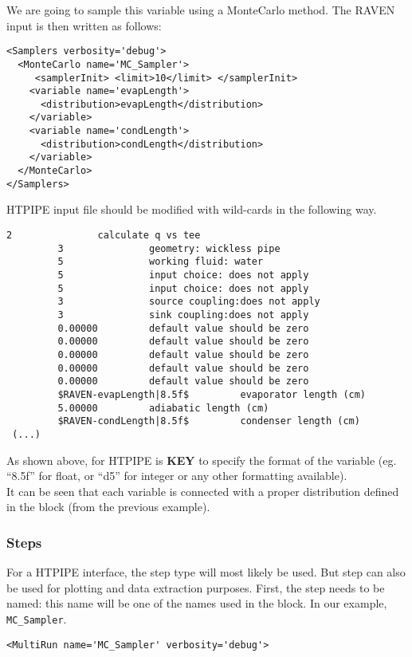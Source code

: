 \noindent We are going to sample this variable using a MonteCarlo method.
The RAVEN input is then written as follows:

\begin{lstlisting}[style=XML,morekeywords={name,type,construction,lowerBound,steps,limit,initialSeed}]
<Samplers verbosity='debug'>
  <MonteCarlo name='MC_Sampler'>
     <samplerInit> <limit>10</limit> </samplerInit>
    <variable name='evapLength'>
      <distribution>evapLength</distribution>
    </variable>
    <variable name='condLength'>
      <distribution>condLength</distribution>
    </variable>
  </MonteCarlo>
</Samplers>
\end{lstlisting}

HTPIPE input file should be modified with wild-cards in the following way.
\begin{lstlisting}[basicstyle=\tiny]
         2               calculate q vs tee
         3               geometry: wickless pipe    
         5               working fluid: water     
         5               input choice: does not apply      
         5               input choice: does not apply      
         3               source coupling:does not apply      
         3               sink coupling:does not apply      
         0.00000         default value should be zero                                     
         0.00000         default value should be zero                                     
         0.00000         default value should be zero                                     
         0.00000         default value should be zero                                     
         0.00000         default value should be zero                                     
         $RAVEN-evapLength|8.5f$         evaporator length (cm)
         5.00000         adiabatic length (cm)
         $RAVEN-condLength|8.5f$         condenser length (cm)                                            
 (...) 
\end{lstlisting}

As shown above, for HTPIPE is \textbf{KEY} to specify the format of the variable (eg. ``8.5f'' for float, or ``d5'' for integer or any other formatting available).\\

\noindent It can be seen that each variable is connected with a proper distribution
defined in the  block (from the previous example).

\subsubsection{Steps}
For a HTPIPE interface, the  step type will most likely be
used. But  step can also be used for plotting and data extraction purposes.
%
First, the step needs to be named: this name will be one of the names used in
the  block.
%
In our example,  \texttt{MC\_Sampler}.
%
\begin{lstlisting}[style=XML,morekeywords={name,debug,re-seeding}]
     <MultiRun name='MC_Sampler' verbosity='debug'>
\end{lstlisting}

